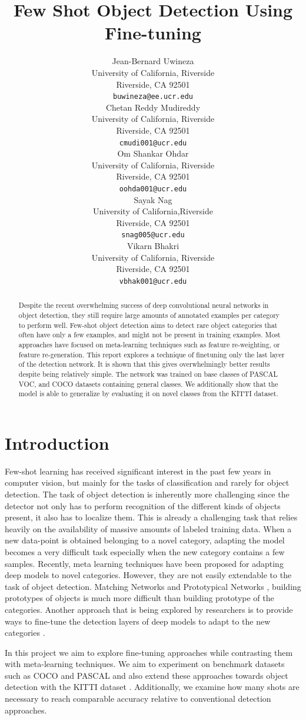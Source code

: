 \documentclass{article}
\title{Few Shot Object Detection Using Fine-tuning}
\author{%
  Jean-Bernard Uwineza 
  \\
  University of California, Riverside\\
  Riverside, CA 92501 \\
  \texttt{buwineza@ee.ucr.edu} \\
  \And
  Chetan Reddy Mudireddy \\
  University of California, Riverside \\
  Riverside, CA 92501 \\
  \texttt{cmudi001@ucr.edu} \\
  \AND
  Om Shankar Ohdar \\
  University of California, Riverside \\
  Riverside, CA 92501 \\
  \texttt{oohda001@ucr.edu} \\
  \And
  Sayak Nag \\
  University of California,Riverside \\
  Riverside, CA 92501 \\
  \texttt{snag005@ucr.edu} \\
  \And
  Vikarn Bhakri \\
  University of California, Riverside \\
  Riverside, CA 92501 \\
  \texttt{vbhak001@ucr.edu} \\
}
\begin{document}
\maketitle

\begin{abstract} 

Despite the recent overwhelming success of deep convolutional neural networks in  
object detection, they  still require large amounts of annotated examples per category  
to perform well. Few-shot object detection aims to detect rare object categories that 
often have only a few examples, and might not be present in training examples. 
Most approaches have focused on meta-learning techniques such as feature re-weighting, 
or feature re-generation. 
This report explores a technique of finetuning only the last layer of the detection network. 
It is shown that this  gives overwhelmingly better results despite being relatively simple. 
The network was trained on base classes of PASCAL VOC, and COCO datasets containing general classes. 
We additionally show that the model is able to generalize by evaluating it on novel 
classes from the KITTI dataset. 
\end{abstract}

\section{Introduction}
{\color{black}
Few-shot learning has received significant interest in the past few years in computer vision, 
but mainly for the tasks of classification and rarely for object detection. 
The task of object detection is inherently more challenging since the detector 
not only has to perform recognition of the different kinds of objects present,
it also has to localize them. This is already a challenging task that relies heavily 
on the availability of massive amounts of labeled training data. When a new data-point 
is obtained belonging to a novel category, adapting the model becomes a very difficult 
task especially when the new category contains a few samples. Recently, meta learning techniques 
have been proposed for adapting deep models to novel categories. However, they are not easily 
extendable to the task of object detection. Matching Networks \cite{VinyalsBLKW16} 
and Prototypical Networks \cite{snell2017prototypical}, building prototypes of objects is 
much more difficult than building prototype of the categories. Another approach that is being 
explored by researchers is to provide ways to fine-tune the detection layers of 
deep models to adapt to the new categories \cite{wang2020frustratingly}.


In this project we aim to explore fine-tuning approaches while contrasting them with meta-learning techniques. 
We aim to experiment on benchmark datasets such as 
COCO \cite{LinMBHPRDZ14} and PASCAL \cite{Everingham10} and also extend these approaches 
towards object detection with the KITTI dataset \cite{Geiger2013IJRR}.
Additionally, we examine how many shots are necessary to reach comparable accuracy relative to 
conventional detection approaches.
} 
\end{document}
